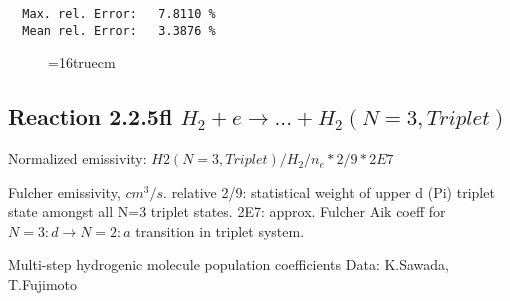 \documentclass[12pt,dvipdfmx]{article}
\begin{document}
\begin{small}
\begin{verbatim}
  Max. rel. Error:   7.8110 %
  Mean rel. Error:   3.3876 %

\end{verbatim}\end{small}
\begin{figure} \label{2.2.5e}
\epsfxsize=16truecm
\end{figure}

\newpage
\subsection{
Reaction 2.2.5fl $H_2 + e \rightarrow ...+ H_2(N=3,Triplet)$}

Normalized emissivity: $H2(N=3, Triplet)/H_2/n_e*2/9* 2E7 $

 Fulcher emissivity, $cm^3/s$. relative 2/9: statistical weight of upper d (Pi) triplet state
amongst all N=3 triplet states.
2E7: approx. Fulcher Aik coeff for $N=3: d \rightarrow N=2: a$ transition in triplet system.

 Multi-step hydrogenic molecule population coefficients
 Data: K.Sawada, T.Fujimoto \cite{kn:Sawada}
\end{document}
